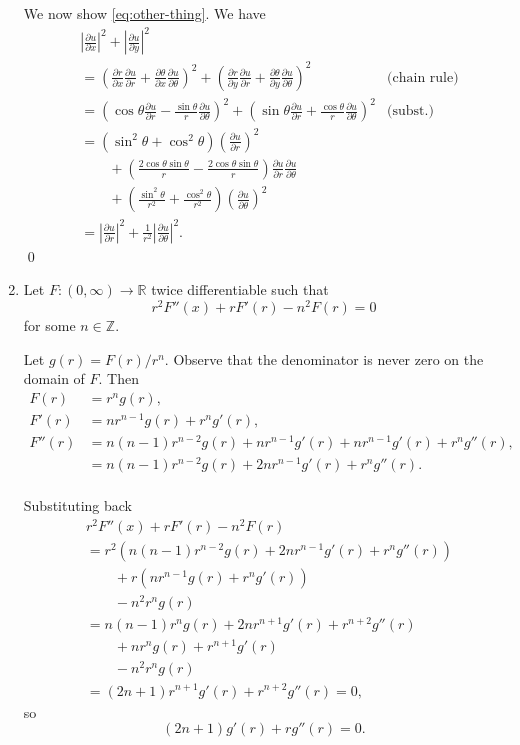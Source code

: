 \documentclass[oneside]{article}
\newcommand\abs[1]{\left|#1\right|}
\newcommand\bbR{\mathbb{R}}
\newcommand\bbZ{\mathbb{Z}}
\begin{document}
\begin{enumerate}[label=\textbf{\arabic*.}]
We now show \cref{eq:other-thing}. We have\begin{align*}
&\abs{\frac{\partial u}{\partial x}}^2 + \abs{\frac{\partial u}{\partial y}}^2 \\
&= \left(
    \frac{\partial r}{\partial x}\frac{\partial u}{\partial r}
    + \frac{\partial\theta}{\partial x}\frac{\partial u}{\partial\theta}
  \right)^2 + \left(
    \frac{\partial r}{\partial y}\frac{\partial u}{\partial r}
    + \frac{\partial\theta}{\partial y}\frac{\partial u}{\partial\theta}
  \right)^2 &\text{(chain rule)}\\
&= \left(
    \cos\theta\frac{\partial u}{\partial r}
    -\frac{\sin\theta}{r}\frac{\partial u}{\partial\theta}
  \right)^2 + \left(
    \sin\theta\frac{\partial u}{\partial r}
    + \frac{\cos\theta}{r}\frac{\partial u}{\partial\theta}
  \right)^2 &\text{(subst.)}\\
&= \left(\sin^2\theta + \cos^2\theta\right)
   \left(\frac{\partial u}{\partial r}\right)^2 \\
 &\qquad+ \left(\frac{2\cos\theta\sin\theta}{r}
                - \frac{2\cos\theta\sin\theta}{r}\right)
   \frac{\partial u}{\partial r}\frac{\partial u}{\partial\theta} \\
 &\qquad+ \left(\frac{\sin^2\theta}{r^2} + \frac{\cos^2\theta}{r^2}\right)
   \left(\frac{\partial u}{\partial\theta}\right)^2 \\
&= \abs{\frac{\partial u}{\partial r}}^2
  + \frac{1}{r^2}\abs{\frac{\partial u}{\partial\theta}}^2 \text{.}
\end{align*} \qed
  
  \item
  Let $F : (0, \infty) \to \bbR$ twice differentiable such that \[
  r^2F''(x) + rF'(r) - n^2F(r) = 0
\] for some $n \in \bbZ$.

Let $g(r) = F(r)/r^n$. Observe that the denominator is never zero on the domain
of $F$. Then \begin{align*}
  F(r) &= r^ng(r)\text{,} \\
  F'(r) &= nr^{n-1}g(r) + r^ng'(r)\text{,} \\
  F''(r) &= n(n-1)r^{n-2}g(r) + nr^{n-1}g'(r) + nr^{n-1}g'(r) + r^ng''(r)\text{,} \\
  &= n(n-1)r^{n-2}g(r) + 2nr^{n-1}g'(r) + r^ng''(r)\text{.} \\
\end{align*}

Substituting back\begin{align*}
&r^2F''(x) + rF'(r) - n^2F(r) \\
&= r^2\left(n(n-1)r^{n-2}g(r) + 2nr^{n-1}g'(r) + r^ng''(r)\right) \\
&\qquad+ r\left(nr^{n-1}g(r) + r^ng'(r)\right) \\
&\qquad- n^2r^ng(r) \\
&= n(n-1)r^ng(r) + 2nr^{n+1}g'(r) + r^{n+2}g''(r) \\
&\qquad+ nr^ng(r) + r^{n+1}g'(r) \\
&\qquad- n^2r^ng(r) \\
&= (2n + 1)r^{n+1}g'(r) + r^{n+2}g''(r) = 0\text{,}
\end{align*} so\[
  (2n + 1)g'(r) + rg''(r) = 0\text{.}
\]


\end{enumerate}
\end{document}

